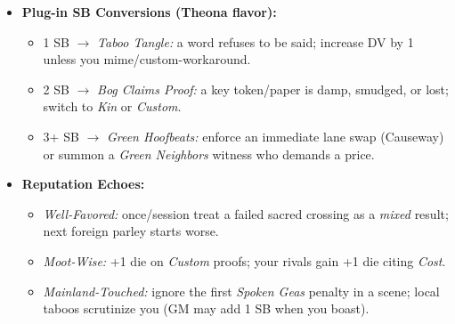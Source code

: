 \begin{itemize}
  \item \textbf{Plug-in SB Conversions (Theona flavor):}
  \begin{itemize}
    \item 1 SB \(\rightarrow\) \emph{Taboo Tangle:} a word refuses to be said; increase DV by 1 unless you mime/custom-workaround.
    \item 2 SB \(\rightarrow\) \emph{Bog Claims Proof:} a key token/paper is damp, smudged, or lost; switch to \emph{Kin} or \emph{Custom}.
    \item 3+ SB \(\rightarrow\) \emph{Green Hoofbeats:} enforce an immediate lane swap (Causeway) or summon a \emph{Green Neighbors} witness who demands a price.
  \end{itemize}

  \item \textbf{Reputation Echoes:}
  \begin{itemize}
    \item \emph{Well-Favored:} once/session treat a failed sacred crossing as a \emph{mixed} result; next foreign parley starts worse.
    \item \emph{Moot-Wise:} +1 die on \emph{Custom} proofs; your rivals gain +1 die citing \emph{Cost}.
    \item \emph{Mainland-Touched:} ignore the first \emph{Spoken Geas} penalty in a scene; local taboos scrutinize you (GM may add 1 SB when you boast).
  \end{itemize}
\end{itemize}